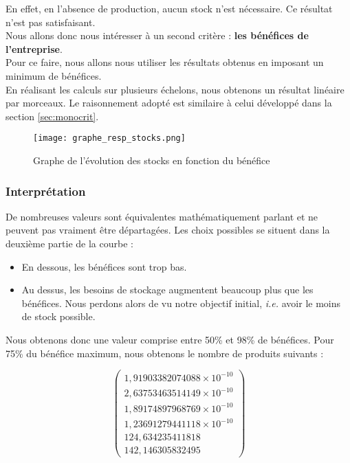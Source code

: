En effet, en l'absence de production, aucun stock n'est nécessaire. Ce résultat
n'est pas satisfaisant.\\
Nous allons donc nous intéresser à un second critère : \textbf{les bénéfices de l'entreprise}.\\
Pour ce faire, nous allons nous utiliser les résultats obtenus en imposant un minimum de bénéfices.\\
En réalisant les calculs sur plusieurs échelons, nous obtenons un résultat linéaire par morceaux. Le
raisonnement adopté est similaire à celui développé dans la section \ref{sec:monocrit}.

\begin{figure}[!ht]
	\texttt{[image: graphe\_resp\_stocks.png]}
	\caption{Graphe de l'évolution des stocks en fonction du bénéfice}
\end{figure}

\subsubsection{Interprétation} 
De nombreuses valeurs sont équivalentes mathématiquement parlant et ne peuvent pas vraiment être départagées. 
Les choix possibles se situent dans la deuxième partie de la courbe :
\begin{itemize}
	\item En dessous, les bénéfices sont trop bas.
	\item Au dessus, les besoins de stockage augmentent beaucoup plus que les bénéfices. Nous perdons alors de vu notre
	objectif initial, \textsl{i.e.} avoir le moins de stock possible.
\end{itemize}

Nous obtenons donc une valeur comprise entre 50\% et 98\% de bénéfices. 
Pour 75\% du bénéfice maximum, nous obtenons le nombre de produits suivants :

\begin{equation}
\begin{pmatrix}
1,91903382074088 \times 10^{-10} \\
2,63753463514149 \times 10^{-10} \\ 
1,89174897968769 \times 10^{-10} \\
1,23691279441118 \times 10^{-10} \\ 
124,634235411818 \\
142,146305832495 
\end{pmatrix}
\end{equation}

